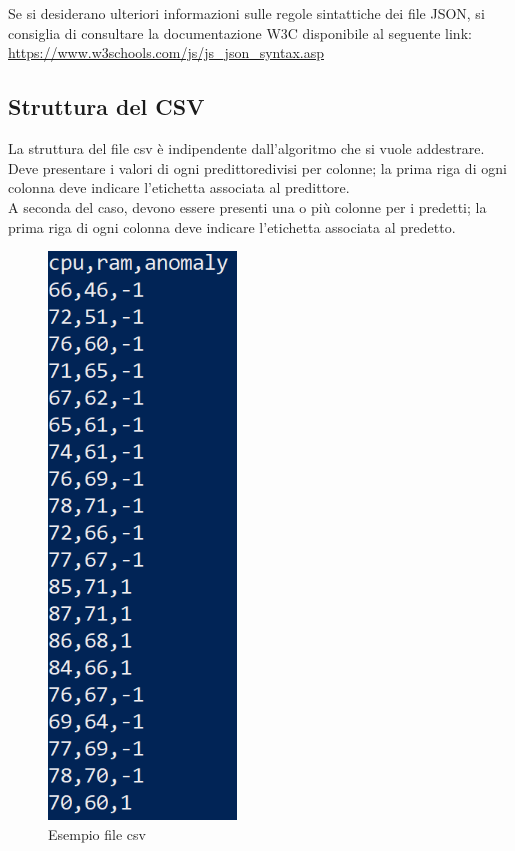 		\mbox{} \\ \\ 
		Se si desiderano ulteriori informazioni sulle regole sintattiche dei file JSON, si consiglia di consultare la documentazione W3C disponibile al seguente link:
		\\[0.2cm]
		\hspace*{10mm}
		\url{https://www.w3schools.com/js/js_json_syntax.asp}
		
	\subsection{Struttura del CSV}
	La struttura del file csv è indipendente dall'algoritmo che si vuole addestrare.
	Deve presentare i valori di ogni predittore\glosp divisi per colonne; la prima riga di ogni colonna deve indicare l'etichetta associata al predittore\glo. \\
	A seconda del caso, devono essere presenti una o più colonne per i predetti; la prima riga di ogni colonna deve indicare l'etichetta associata al predetto.
	\mbox{}
	\begin{figure} [H]
		\begin{center}
			\includegraphics[width=50mm]{./img/csv1.png}
		\end{center}
		\caption{Esempio file csv}
	\end{figure}
